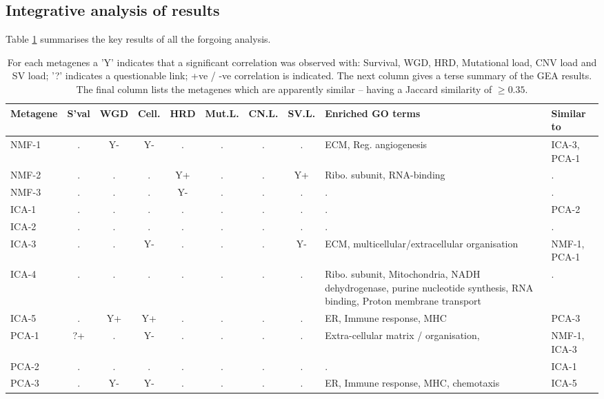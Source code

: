 \documentclass[tikz, 12pt,a4paper,oneside,fleqn]{article}
\begin{document}
\FloatBarrier

\subsection{Integrative analysis of results}
\label{sec-integrative-analysis}

Table \ref{tab-integrative-analysis} summarises the key results of all the forgoing analysis.  
 
\begin{table}[htb!]
\begin{center}
\begingroup
\scriptsize
\renewcommand{\arraystretch}{1.4} %
\begin{tabular}{|l||c|c|c|c|c|c|c|p{4.5cm}|l|}
\hline
Metagene & S'val & WGD & Cell. & HRD & Mut.L. & CN.L. & SV.L. & Enriched GO terms & Similar to\\
\hline
NMF-1 & . & Y-& Y-& . & . & . & . & ECM, Reg. angiogenesis & ICA-3, PCA-1 \\
NMF-2 & . & . & . & Y+& . & . & Y+& Ribo. subunit, RNA-binding & . \\
NMF-3 & . & . & . & Y-& . & . & . & . & . \\
\hline
ICA-1 & . & . & . & . & . & . & . & . & PCA-2 \\
ICA-2 & . & . & . & . & . & . & . & . & . \\
ICA-3 & . & . & Y-& . & . & . & Y-& ECM, multicellular/extracellular organisation & NMF-1, PCA-1 \\
ICA-4 & . & . & . & . & . & . & . & Ribo. subunit, Mitochondria, NADH dehydrogenase, purine nucleotide synthesis, RNA binding, Proton membrane transport & . \\
ICA-5 & . & Y+& Y+& . & . & . & . & ER, Immune response, MHC & PCA-3 \\
\hline
PCA-1 & ?+& . & Y-& . & . & . & . & Extra-cellular matrix / organisation, & NMF-1, ICA-3 \\
PCA-2 & . & . & . & . & . & . & . & . & ICA-1 \\
PCA-3 & . & Y-& Y-& . & . & . & . & ER, Immune response, MHC, chemotaxis & ICA-5 \\
\hline
\end{tabular}
\endgroup
\end{center}
\caption{For each metagenes a 'Y' indicates that a significant correlation was observed with: Survival, WGD, HRD, Mutational load,  CNV load and SV load;  '?' indicates a questionable link; +ve / -ve correlation is indicated.  The next column gives a terse summary of the GEA results.  The final column lists the metagenes which are apparently similar -- having a Jaccard similarity of $\geq 0.35$.}
\label{tab-integrative-analysis}
\end{table}
\end{document}
